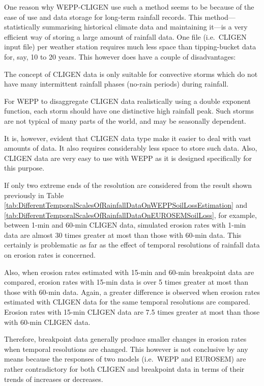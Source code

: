 One reason why WEPP-CLIGEN use such a method seems to be because of the ease of
use and data storage for long-term rainfall records. This method---statistically
summarising historical climate data and maintaining it---is a very efficient way
of storing a large amount of rainfall data. One file (i.e.\ CLIGEN input file)
per weather station requires much less space than tipping-bucket data for, say,
10 to 20 years. This however does have a couple of disadvantages:
\begin{enumerate*}
  \item The concept of CLIGEN data is only suitable for convective storms which
do not have many intermittent rainfall phases (no-rain periods) during rainfall.
\medskip
  \item For WEPP to disaggregate CLIGEN data realistically using a double
exponent function, each storm should have one distinctive high rainfall peak.
Such storms are not typical of many parts of the world, and may be seasonally
dependent.
\end{enumerate*}
It is, however, evident that CLIGEN data type make it easier to deal with vast
amounts of data. It also requires considerably less space to store such data.
Also, CLIGEN data are very easy to use with WEPP as it is designed specifically
for this purpose.

If only two extreme ends of the resolution are considered from the result shown
previously in Table
\ref{tab:DifferentTemporalScalesOfRainfallDataOnWEPPSoilLossEstimation} and
\ref{tab:DifferentTemporalScalesOfRainfallDataOnEUROSEMSoilLoss}, for example,
between 1-min and 60-min CLIGEN data, simulated erosion rates with 1-min data
are almost 30 times greater at most than those with 60-min data. This certainly
is problematic as far as the effect of temporal resolutions of rainfall data on
erosion rates is concerned.

Also, when erosion rates estimated with 15-min and 60-min breakpoint data are
compared, erosion rates with 15-min data is over 5 times greater at most than
those with 60-min data. Again, a greater difference is observed when erosion
rates estimated with CLIGEN data for the same temporal resolutions are compared.
Erosion rates with 15-min CLIGEN data are 7.5 times greater at most than those
with 60-min CLIGEN data.

Therefore, breakpoint data generally produce smaller changes in erosion rates
when temporal resolutions are changed. This however is not conclusive by any
means because the responses of two models (i.e.\ WEPP and EUROSEM) are rather
contradictory for both CLIGEN and breakpoint data in terms of their trends of
increases or decreases.

